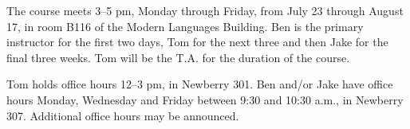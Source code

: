 The course meets 3--5 pm, Monday through Friday, from July 23 through
August 17, in room B116 of the Modern Languages Building.  
Ben is the primary instructor for the first two days, Tom for the next three and then Jake for the final three weeks. Tom will be the T.A. for the duration of the course.

Tom holds office hours 12--3 pm, in Newberry 301. Ben and/or Jake
have office hours Monday, Wednesday and Friday between 9:30 and 10:30
a.m., in Newberry 307. Additional office hours may be announced.

